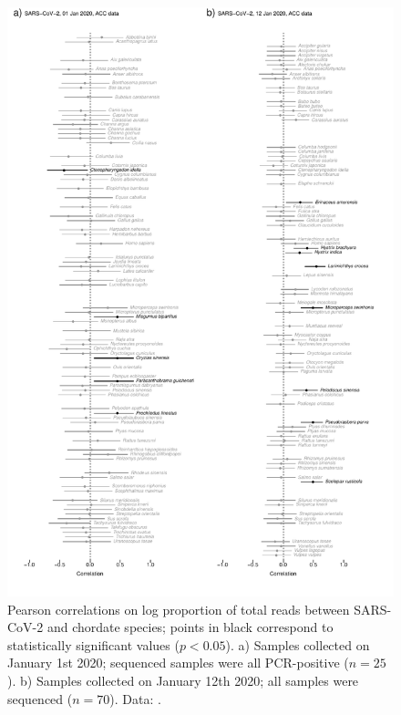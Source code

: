 \documentclass[11pt]{article}
\def \sct {\mbox{SARS-CoV-2}}
\begin{document}
\begin{figure}[h!]
\includegraphics[width = \textwidth]{figS1.pdf}
\caption{Pearson correlations on log proportion of total reads between \sct{} and chordate species; points in black correspond to statistically significant values ($p < 0.05$). a) Samples collected on January 1st 2020; sequenced samples were all PCR-positive ($n = 25$). b) Samples collected on January 12th 2020; all samples were sequenced ($n = 70$). Data: \citet{ACC2023bioRxiv}. }
\label{fig:corsACC}
\end{figure}
\end{document}

